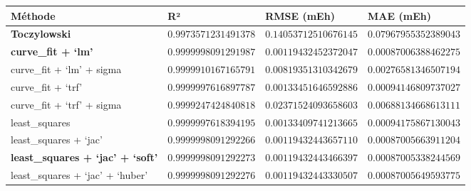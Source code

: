 \documentclass[11pt]{article}
\begin{document}
{\def\LTcaptype{none} %
\begin{longtable}[]{@{}
  >{\raggedright\arraybackslash}p{}
  >{\raggedright\arraybackslash}p{}
  >{\raggedright\arraybackslash}p{}
  >{\raggedright\arraybackslash}p{}@{}}
\toprule\noalign{}
\begin{minipage}[b]{\linewidth}\raggedright
Méthode
\end{minipage} & \begin{minipage}[b]{\linewidth}\raggedright
R²
\end{minipage} & \begin{minipage}[b]{\linewidth}\raggedright
RMSE (mEh)
\end{minipage} & \begin{minipage}[b]{\linewidth}\raggedright
MAE (mEh)
\end{minipage} \\
\midrule\noalign{}
\endhead
\bottomrule\noalign{}
\endlastfoot
\textbf{Toczylowski} & \(0.9973571231491378\) & \(0.14053712510676145\)
& \(0.07967955352389043\) \\
\textbf{curve\_fit + `lm'} & \(0.9999998091291987\) &
\(0.00119432452372047\) & \(0.00087006388462275\) \\
curve\_fit + `lm' + sigma & \(0.9999910167165791\) &
\(0.00819351310342679\) & \(0.00276581346507194\) \\
curve\_fit + `trf' & \(0.9999997616897787\) & \(0.00133451646592886\) &
\(0.00094146809737027\) \\
curve\_fit + `trf' + sigma & \(0.9999247424840818\) &
\(0.02371524093658603\) & \(0.00688134668613111\) \\
least\_squares & \(0.9999997618394195\) & \(0.00133409741213665\) &
\(0.00094175867130043\) \\
least\_squares + `jac' & \(0.9999998091292266\) &
\(0.00119432443657110\) & \(0.00087005663911204\) \\
\textbf{least\_squares + `jac' + `soft'} & \(0.9999998091292273\) &
\(0.00119432443466397\) & \(0.00087005338244569\) \\
least\_squares + `jac' + `huber' & \(0.9999998091292276\) &
\(0.00119432443330507\) & \(0.00087005649593775\) \\
\end{longtable}
}
\end{document}
